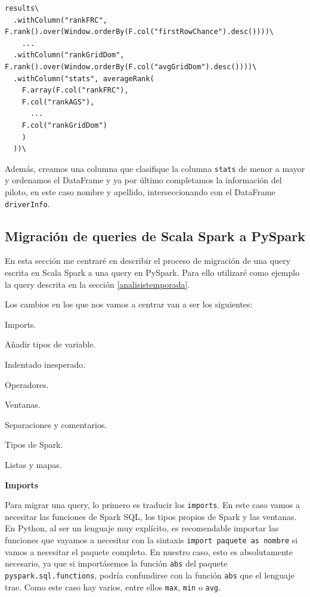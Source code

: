 \documentclass[12pt,twoside,titlepage]{report}
\begin{document}
\begin{lstlisting}
results\
  .withColumn("rankFRC", F.rank().over(Window.orderBy(F.col("firstRowChance").desc())))\
    ...
  .withColumn("rankGridDom", F.rank().over(Window.orderBy(F.col("avgGridDom").desc())))\
  .withColumn("stats", averageRank(
    F.array(F.col("rankFRC"),
    F.col("rankAGS"),
      ...
    F.col("rankGridDom")
    )
  ))\
\end{lstlisting}

Además, creamos una columna que clasifique la columna \texttt{stats} de menor a mayor y ordenamos el DataFrame y ya por último completamos la información del piloto, en este caso nombre y apellido, interseccionando con el DataFrame \texttt{driverInfo}.


\subsection{Migración de queries de Scala Spark a PySpark}

En esta sección me centraré en describir el proceso de migración de una query escrita en Scala Spark a una query en PySpark. Para ello utilizaré como ejemplo la query descrita en la sección \ref{analisistemporada}.

Los cambios en los que nos vamos a centrar van a ser los siguientes:

\begin{compactlist}
	\item Imports.
	\item Añadir tipos de variable.
	\item Indentado inesperado.
	\item Operadores.
	\item Ventanas.
	\item Separaciones y comentarios.
	\item Tipos de Spark.
	\item Listas y mapas.
\end{compactlist}


\textbf{Imports}

Para migrar una query, lo primero es traducir los \texttt{imports}. En este caso vamos a necesitar las funciones de Spark SQL, los tipos propios de Spark y las ventanas. En Python, al ser un lenguaje muy explícito, es recomendable importar las funciones que vayamos a necesitar con la sintaxis \texttt{import {paquete} as {nombre}} si vamos a necesitar el paquete completo. En nuestro caso, esto es absolutamente necesario, ya que si importásemos la función \texttt{abs} del paquete \texttt{pyspark.sql.functions}, podría confundirse con la función \texttt{abs} que el lenguaje trae. Como este caso hay varios, entre ellos \texttt{max}, \texttt{min} o \texttt{avg}.
\end{document}
